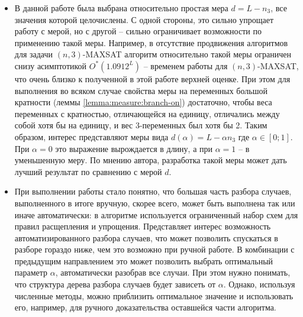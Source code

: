 \begin{itemize}
 \item В данной работе была выбрана относительно простая мера $d = L - n_3$, все значения которой целочислены. С одной стороны, это сильно упрощает работу с мерой, но с другой -- сильно ограничивает возможности по применению такой меры. Например, в отсутствие продвижения алгоритмов для задачи $(n,3)$-MAXSAT алгоритм относительно такой меры ограничен снизу асимптотикой $O^*(1.0912^L)$ -- временем работы для $(n,3)$-MAXSAT, что очень близко к полученной в этой работе верхней оценке. При этом для выполнения во всяком случае свойства меры на переменных большой кратности (леммы \ref{lemma:measure:branch-on}) достаточно, чтобы веса переменных с кратностью, отличающейся на единицу, отличались между собой хотя бы на единицу, и вес 3-переменных был хотя бы 2. Таким образом, интерес представляют меры вида $d(\alpha) = L - \alpha n_3$ где $\alpha \in [0; 1]$. При $\alpha = 0$ это выражение вырождается в длину, а при $\alpha = 1$ -- в уменьшенную меру. По мнению автора, разработка такой меры может дать лучший результат по сравнению с мерой $d$.

 \item При выполнении работы стало понятно, что большая часть разбора случаев, выполненного в итоге вручную, скорее всего, может быть выполнена так или иначе автоматически: в алгоритме используется ограниченный набор схем для правил расщепления и упрощения. Представляет интерес возможность автоматизированного разбора случаев, что может позволить спускаться в разборе гораздо ниже, чем это возможно при ручной работе. В комбинации с предыдущим направлением это может позволить выбрать оптимальный параметр $\alpha$, автоматически разобрав все случаи. При этом нужно понимать, что структура дерева разбора случаев будет зависеть от $\alpha$. Однако, используя численные методы, можно приблизить оптимальное значение и использовать его, например, для ручного доказательства оставшейся части алгоритма.
\end{itemize}

